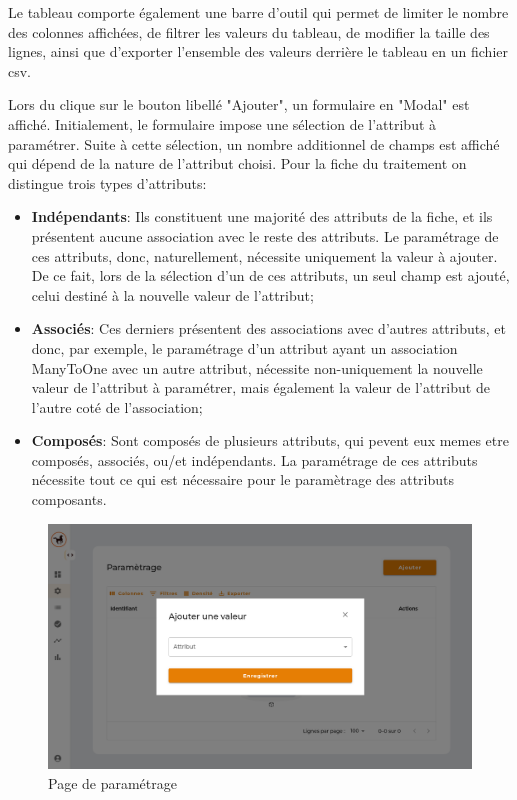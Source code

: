 \noindent Le tableau comporte également une barre d'outil qui permet de limiter le nombre des colonnes affichées, de filtrer les valeurs du tableau, de modifier la taille des lignes, ainsi que d'exporter l'ensemble des valeurs derrière le tableau en un fichier csv.
\clearpage

\noindent Lors du clique sur le bouton libellé "Ajouter", un formulaire en "Modal" est affiché. Initialement, le formulaire impose une sélection de l'attribut à paramétrer. Suite à cette sélection, un nombre additionnel de champs est affiché qui dépend de la nature de l'attribut choisi. Pour la fiche du traitement on distingue trois types d'attributs: \\

\begin{itemize}
    \item  \textbf{Indépendants}: Ils constituent une majorité des attributs de la fiche, et ils présentent aucune association avec le reste des attributs. Le paramétrage de ces attributs, donc, naturellement, nécessite uniquement la valeur à ajouter. De ce fait, lors de la sélection d'un de ces attributs, un seul champ est ajouté, celui destiné à la nouvelle valeur de l'attribut;
    \item \textbf{Associés}: Ces derniers présentent des associations avec d'autres attributs, et donc, par exemple, le paramétrage d'un attribut ayant un association ManyToOne avec un autre attribut, nécessite non-uniquement la nouvelle valeur de l'attribut à paramétrer, mais également la valeur de l'attribut de l'autre coté de l'association;
    \item \textbf{Composés}: Sont composés de plusieurs attributs, qui pevent eux memes etre composés, associés, ou/et indépendants. La paramétrage de ces attributs nécessite tout ce qui est nécessaire pour le paramètrage des attributs composants.
\end{itemize}




\begin{figure}[H]
    \includegraphics[width=.7\textwidth]{images/guis/parametrage/form-initial.png}
    \caption{Page de paramétrage}
\end{figure}

